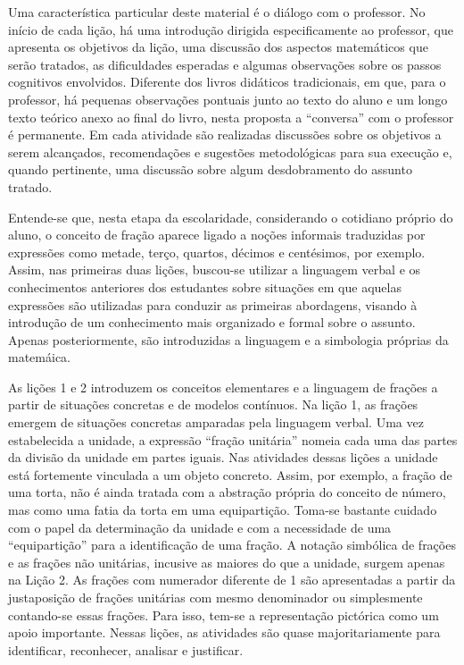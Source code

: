 Uma característica particular deste material é o diálogo com o professor. No início de cada lição, há uma introdução dirigida especificamente ao professor, que apresenta os objetivos da lição, uma discussão dos aspectos matemáticos que serão tratados, as dificuldades esperadas e algumas observações sobre os passos cognitivos envolvidos. Diferente dos livros didáticos tradicionais, em que, para o professor, há pequenas observações pontuais junto ao texto do aluno e um longo texto teórico anexo ao final do livro, nesta proposta a ``conversa'' com o professor é permanente. Em cada atividade são realizadas discussões sobre os objetivos a serem alcançados, recomendações e sugestões metodológicas para sua execução e, quando pertinente, uma discussão sobre algum desdobramento do assunto tratado.


Entende-se que, nesta etapa da escolaridade, considerando o cotidiano próprio do aluno, o conceito de fração aparece ligado a  noções informais traduzidas por expressões como metade, terço, quartos, décimos e centésimos, por exemplo. Assim, nas primeiras duas lições, buscou-se utilizar a linguagem verbal e os conhecimentos anteriores dos estudantes sobre situações em que aquelas expressões são utilizadas para conduzir as primeiras abordagens, visando à introdução de um conhecimento mais organizado e formal sobre o assunto. Apenas posteriormente, são introduzidas a linguagem e a simbologia próprias da matemáica.

As lições 1 e 2 introduzem os conceitos elementares e a linguagem de frações a partir de situações concretas e de modelos contínuos. Na lição 1, as frações emergem de situações concretas amparadas pela linguagem verbal. Uma vez estabelecida a unidade, a expressão ``fração unitária'' nomeia cada uma das partes da divisão da unidade em partes iguais. Nas atividades dessas lições a unidade está fortemente vinculada a um objeto concreto. Assim, por exemplo, a fração de uma torta, não é ainda tratada com a abstração própria do conceito de número, mas como uma fatia da torta em uma equipartição. Toma-se bastante cuidado com o papel da determinação da unidade e com a necessidade de uma ``equipartição'' para a identificação de uma fração. A notação simbólica de frações e as frações não unitárias, incusive as maiores do que a unidade, surgem apenas na Lição 2. As frações com numerador diferente de 1 são apresentadas a partir da justaposição de frações unitárias com mesmo denominador ou simplesmente contando-se essas frações. Para isso, tem-se a representação pictórica como um apoio importante. Nessas lições, as atividades são quase majoritariamente para identificar, reconhecer, analisar e justificar.

